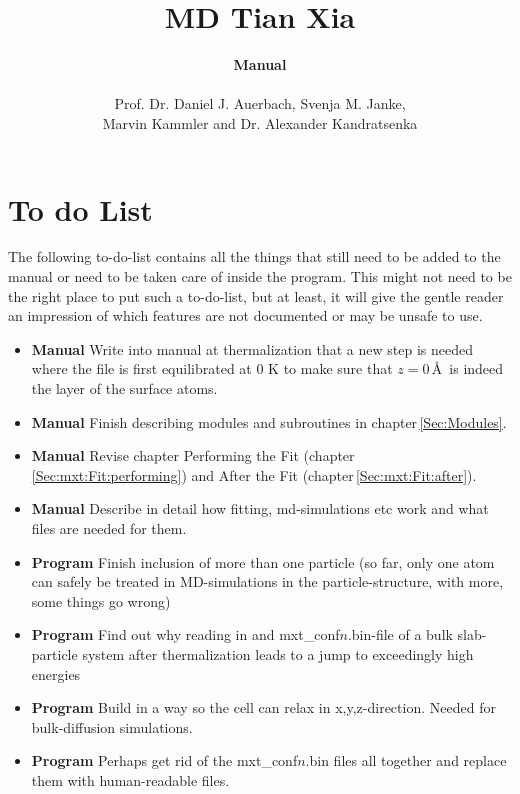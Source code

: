 \documentclass[twoside, 11pt, titlepage, captions=nooneline, a4paper, headsepline]{scrbook}%
\title{\huge{MD Tian Xia}}
\author{\textbf{Manual}\\ \\Prof. Dr. Daniel J. Auerbach, Svenja M. Janke,\\Marvin Kammler and Dr. Alexander Kandratsenka}
\date{}
\newcommand{\9}{\mathrm}
\newcommand{\0}{\,\mathrm}
\begin{document}
\frontmatter

\maketitle
\thispagestyle{empty}
\newpage
\tableofcontents
\newpage


\mainmatter

\chapter{To do List}
The following to-do-list contains all the things that still need to be added to the manual or need to be taken care of inside the program. This might not need to be the right place to put such a to-do-list, but at least, it will give the gentle reader an impression of which features are not documented or may be unsafe to use.\\
\begin{itemize}
\item \textbf{Manual} Write into manual at thermalization that a new step is needed where the file is first equilibrated at 0 K to make sure that $z=0$\,\AA~is indeed the layer of the surface atoms.
\item\textbf{Manual} Finish describing modules and subroutines in chapter\,\ref{Sec:Modules}.
\item\textbf{Manual} Revise chapter Performing the Fit (chapter\,\ref{Sec:mxt:Fit:performing}) and After the Fit (chapter\,\ref{Sec:mxt:Fit:after}).
\item\textbf{Manual} Describe in detail how fitting, md-simulations etc work and what files are needed for them.
\item\textbf{Program} Finish inclusion of more than one particle (so far, only one atom can safely be treated in MD-simulations in the particle-structure, with more, some things go wrong) 
\item\textbf{Program} Find out why reading in and mxt\_conf$n$.bin-file of a bulk slab-particle system after thermalization leads to a jump to exceedingly high energies
\item\textbf{Program} Build in a way so the cell can relax in x,y,z-direction. Needed for bulk-diffusion simulations.
\item\textbf{Program} Perhaps get rid of the mxt\_conf$n$.bin files all together and replace them with human-readable files.
\end{itemize}
\end{document}
